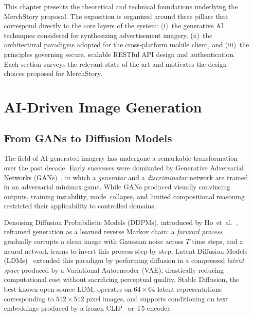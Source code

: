 \documentclass[12pt, a4paper]{report}
\begin{document}
This chapter presents the theoretical and technical foundations underlying the
MerchStory proposal.  The exposition is organized around three pillars that
correspond directly to the core layers of the system:
(i)~the generative AI techniques considered for synthesizing advertisement
imagery, (ii)~the architectural paradigms adopted for the cross-platform mobile
client, and (iii)~the principles governing secure, scalable RESTful API design
and authentication.  Each section surveys the relevant state of the art and
motivates the design choices proposed for MerchStory.

\section{AI-Driven Image Generation}
\label{sec:ai-image-gen}

\subsection{From GANs to Diffusion Models}

The field of AI-generated imagery has undergone a remarkable transformation over
the past decade.  Early successes were dominated by Generative Adversarial
Networks (GANs)~\cite{goodfellow2014generative}, in which a \emph{generator}
and a \emph{discriminator} network are trained in an adversarial minimax game.
While GANs produced visually convincing outputs, training instability,
mode~collapse, and limited compositional reasoning restricted their applicability
to controlled domains.

\medskip\noindent
Denoising Diffusion Probabilistic Models (DDPMs), introduced by
Ho~et~al.~\cite{ho2020denoising}, reframed generation as a learned reverse
Markov chain: a \emph{forward process} gradually corrupts a clean image with
Gaussian noise across $T$ time steps, and a neural network learns to invert
this process step by step.  Latent Diffusion Models
(LDMs)~\cite{rombach2022highresolution} extended this paradigm by performing
diffusion in a compressed \emph{latent space} produced by a
Variational Autoencoder (VAE), drastically reducing computational cost without
sacrificing perceptual quality.  Stable Diffusion, the best-known open-source
LDM, operates on $64{\times}64$ latent representations corresponding to
$512{\times}512$ pixel images, and supports conditioning on text embeddings
produced by a frozen CLIP~\cite{radford2021learning} or T5 encoder.
\end{document}
